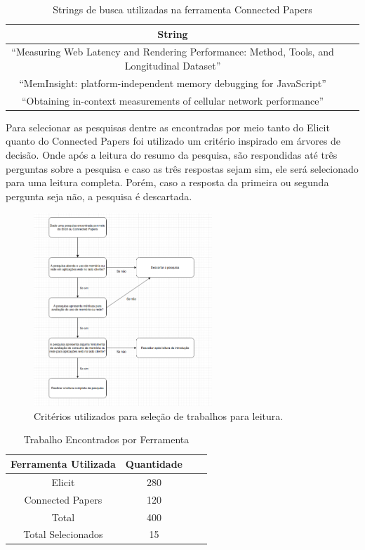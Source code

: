\documentclass[12pt]{tcc}
\begin{document}
\begin{table}[!ht]
	\centering
	\caption{Strings de busca utilizadas na ferramenta Connected Papers}
	\begin{tabular}{c L{1.5cm} R{1.5cm}}
		\toprule
		\textbf{String} \\
		\midrule
		``Measuring Web Latency and Rendering Performance: Method, Tools, and Longitudinal Dataset''  \\
		``MemInsight: platform-independent memory debugging for JavaScript''  \\
		``Obtaining in-context measurements of cellular network performance''  \\
		\bottomrule
	\end{tabular}
	\label{tab:string-busca-connected-papers}
\end{table}

Para selecionar as pesquisas dentre as encontradas por meio tanto do Elicit quanto do Connected Papers foi utilizado um critério inspirado em árvores de decisão.
Onde após a leitura do resumo da pesquisa, são respondidas até três perguntas sobre a pesquisa e caso as três respostas sejam sim, ele será selecionado para uma leitura completa.
Porém, caso a resposta da primeira ou segunda pergunta seja não, a pesquisa é descartada.

\begin{figure}[!ht]
	\centering
	\includegraphics[width=0.6\textwidth]{figures/paper-decision-tree.png}
	\caption{Critérios utilizados para seleção de trabalhos para leitura.}
	\label{fig:fluxo-leitura}
\end{figure}

\begin{table}[!ht]
	\centering
	\caption{Trabalho Encontrados por Ferramenta}
	\begin{tabular}{c  c L{1.5cm} R{1.5cm}}
		\toprule
		\textbf{Ferramenta Utilizada} & \textbf{Quantidade} \\
		\midrule
		Elicit  &  280  \\
		Connected Papers  &  120  \\
		Total  &  400  \\
		Total Selecionados  &  15  \\
		\bottomrule
	\end{tabular}
	\label{tab:trabalhos-encontrados}
\end{table}
\end{document}
